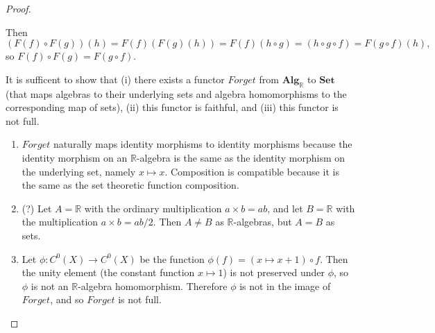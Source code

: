 \documentclass{article}
\newenvironment{problempart}[1]{\begin{trivlist}\item[\textbf{Part #1.}]}{\end{trivlist}}
\begin{document}
\begin{proof}
\begin{enumerate}[(i)]
{    Then \[
      (F(f) \circ F(g))(h) = F(f)(F(g)(h))
      = F(f)(h\circ g)
      = (h\circ g\circ f)
      = F(g\circ f)(h),
    \] so $F(f) \circ F(g) = F(g\circ f)$.
  }
\end{enumerate}
\begin{problempart}{(d)}
  It is sufficent to show that (i) there exists a functor $\textit{Forget}$ from
  $\textbf{Alg}_\mathbb{R}$ to $\textbf{Set}$ (that maps algebras to their
  underlying sets and algebra homomorphisms to the corresponding map of sets),
  (ii) this functor is faithful, and (iii) this functor is not full.
  \begin{enumerate}
    \item{
      $\mathit{Forget}$ naturally maps identity morphisms to identity morphisms
      because the identity morphism on an $\mathbb{R}$-algebra is the same as
      the identity morphism on the underlying set, namely $x \mapsto x$.
      Composition is compatible because it is the same as the set theoretic
      function composition.
    }
    \item{(?)
      Let $A = \mathbb{R}$ with the ordinary multiplication $a \times b = ab$, and
      let $B = \mathbb{R}$ with the multiplication $a \times b = ab/2$. Then
      $A \not= B$ as $\mathbb{R}$-algebras, but $A = B$ as sets.
    }
    \item{
      Let $\phi\colon C^0(X) \rightarrow C^0(X)$ be the function
      $\phi(f) = (x\mapsto x + 1) \circ f$. Then the unity element (the constant
      function $x \mapsto 1$)
      is not preserved under $\phi$, so $\phi$ is not an $\mathbb{R}$-algebra
      homomorphism. Therefore $\phi$ is not in the image of $\textit{Forget}$, and so $\textit{Forget}$ is
      not full.
    }
  \end{enumerate}
\end{problempart}
\end{proof}
\end{document}
